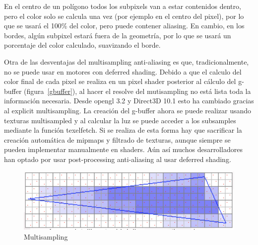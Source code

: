 \documentclass[withindex, glossary]{cam-thesis}
\begin{document}
En el centro de un polígono todos los subpixels van a estar contenidos dentro, pero el color solo se calcula una vez (por ejemplo en el centro del pixel), por lo que se usará el 100\% del color, pero puede contener aliasing. En cambio, en los bordes, algún subpixel estará fuera de la geometría, por lo que se usará un porcentaje del color calculado, suavizando el borde.

Otra de las desventajas del multisampling anti-aliasing es que, tradicionalmente, no se puede usar en motores con deferred shading. Debido a que el calculo del color final de cada pixel se realiza en un pixel shader posterior al cálculo del g-buffer (figura~\ref{gbuffer}), al hacer el resolve del mutisampling no está lista toda la información necesaria. Desde \Gls{opengl} 3.2 y Direct3D 10.1 esto ha cambiado gracias al explicit multisampling\cite{textureMultisample}. La creación del g-buffer ahora se puede realizar usando texturas multisampled y al calcular la luz se puede acceder a los subsamples mediante la función texelfetch. Si se realiza de esta forma hay que sacrificar la creación automática de mipmaps y filtrado de texturas, aunque siempre se pueden implementar manualmente en shaders. Aún así muchos desarrolladores han optado por usar post-processing anti-aliasing al usar deferred shading.

\begin{figure}[!htbp]
    \includegraphics[width=.8\linewidth]{figures/msaasample.png}
    \caption{Multisampling\label{msaasample}}
\end{figure}
\end{document}
